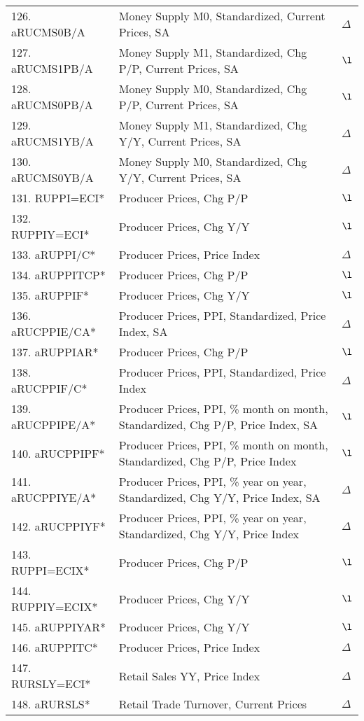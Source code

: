 \documentclass[a4paper, 14pt]{article}
\begin{document}
\begin{center}
\begin{longtable}{p{5.5cm} p{10cm} p{0.15cm}}
	126. aRUCMS0B/A &  Money Supply M0, Standardized, Current Prices, SA & $\Delta$\\
	127. aRUCMS1PB/A &  Money Supply M1, Standardized, Chg P/P, Current Prices, SA & $\l$\\
	128. aRUCMS0PB/A &  Money Supply M0, Standardized, Chg P/P, Current Prices, SA & $\l$\\
	129. aRUCMS1YB/A &  Money Supply M1, Standardized, Chg Y/Y, Current Prices, SA & $\Delta$\\
	130. aRUCMS0YB/A &  Money Supply M0, Standardized, Chg Y/Y, Current Prices, SA & $\Delta$\\
	131. RUPPI=ECI* &  Producer Prices, Chg P/P & $\l$\\
	132. RUPPIY=ECI* &  Producer Prices, Chg Y/Y & $\l$\\
	133. aRUPPI/C* &  Producer Prices, Price Index & $\Delta$\\
	134. aRUPPITCP* &  Producer Prices, Chg P/P & $\l$\\
	135. aRUPPIF* &  Producer Prices, Chg Y/Y & $\l$\\
	136. aRUCPPIE/CA* &  Producer Prices, PPI, Standardized, Price Index, SA & $\Delta$\\
	137. aRUPPIAR* &  Producer Prices, Chg P/P & $\l$\\
	138. aRUCPPIF/C* &  Producer Prices, PPI, Standardized, Price Index & $\Delta$\\
	139. aRUCPPIPE/A* &  Producer Prices, PPI, \% month on month, Standardized, Chg P/P, Price Index, SA & $\l$\\
	140. aRUCPPIPF* &  Producer Prices, PPI, \% month on month, Standardized, Chg P/P, Price Index & $\l$\\
	141. aRUCPPIYE/A* &  Producer Prices, PPI, \% year on year, Standardized, Chg Y/Y, Price Index, SA & $\Delta$\\
	142. aRUCPPIYF* &  Producer Prices, PPI, \% year on year, Standardized, Chg Y/Y, Price Index & $\Delta$\\
	143. RUPPI=ECIX* &  Producer Prices, Chg P/P & $\l$\\
	144. RUPPIY=ECIX* &  Producer Prices, Chg Y/Y & $\l$\\
	145. aRUPPIYAR* &  Producer Prices, Chg Y/Y & $\l$\\
	146. aRUPPITC* &  Producer Prices, Price Index & $\Delta$\\
	147. RURSLY=ECI* &  Retail Sales YY, Price Index & $\Delta$\\
	148. aRURSLS* &  Retail Trade Turnover, Current Prices & $\Delta$\\

\end{longtable}
\end{center}
\end{document}
